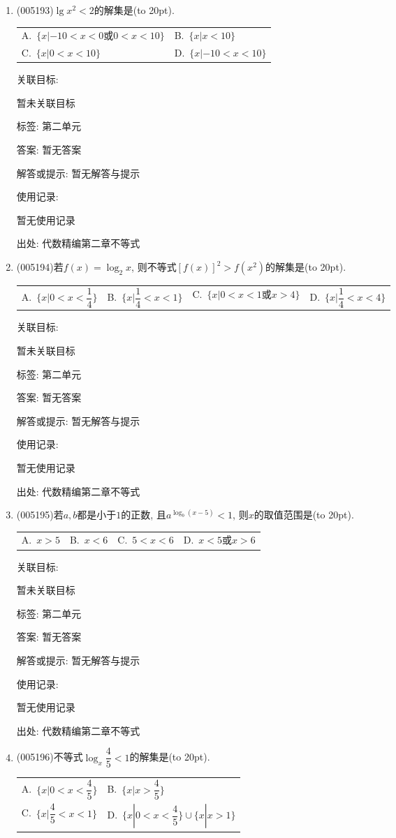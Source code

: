 \documentclass[10pt,a4paper]{article}
\newcommand{\bracket}[1]{(\hbox to #1pt{})}
\newcommand{\twoch}[4]{\par\begin{tabular}{p{.46\textwidth}p{.46\textwidth}}
A.~#1& B.~#2\\
C.~#3& D.~#4
\end{tabular}}
\newcommand{\fourch}[4]{\par\begin{tabular}{p{.23\textwidth}p{.23\textwidth}p{.23\textwidth}p{.23\textwidth}}
A.~#1 &B.~#2& C.~#3& D.~#4
\end{tabular}}
\begin{document}
\begin{enumerate}[1.]
关联目标:

暂未关联目标



标签: 第一单元|第二单元

答案: 暂无答案

解答或提示: 暂无解答与提示

使用记录:

暂无使用记录


出处: 代数精编第二章不等式
\item { (005193)}$\lg x^2<2$的解集是\bracket{20}.
\twoch{$\{x|-10<x<0\text{或}0<x<10\}$}{$\{x|x<10\}$}{$\{x|0<x<10\}$}{$\{x|-10<x<10\}$}


关联目标:

暂未关联目标



标签: 第二单元

答案: 暂无答案

解答或提示: 暂无解答与提示

使用记录:

暂无使用记录


出处: 代数精编第二章不等式
\item { (005194)}若$f(x)=\log_2x$, 则不等式$[f(x)]^2>f(x^2)$的解集是\bracket{20}.
\fourch{$\{x|0<x<\dfrac 14\}$}{$\{x|\dfrac 14<x<1\}$}{$\{x|0<x<1\text{或}x>4\}$}{$\{x|\dfrac 14<x<4\}$}


关联目标:

暂未关联目标



标签: 第二单元

答案: 暂无答案

解答或提示: 暂无解答与提示

使用记录:

暂无使用记录


出处: 代数精编第二章不等式
\item { (005195)}若$a,b$都是小于$1$的正数, 且$a^{\log_b(x-5)}<1$, 则$x$的取值范围是\bracket{20}.
\fourch{$x>5$}{$x<6$}{$5<x<6$}{$x<5$或$x>6$}


关联目标:

暂未关联目标



标签: 第二单元

答案: 暂无答案

解答或提示: 暂无解答与提示

使用记录:

暂无使用记录


出处: 代数精编第二章不等式
\item { (005196)}不等式$\log_x\dfrac 45<1$的解集是\bracket{20}.
\twoch{$\{x|0<x<\dfrac 45\}$}{$\{x|x>\dfrac 45\}$}{$\{x|\dfrac 45<x<1\}$}{$\{x|0<x<\dfrac 45\}\cup \{x|x>1\}$}



\end{enumerate}
\end{document}

